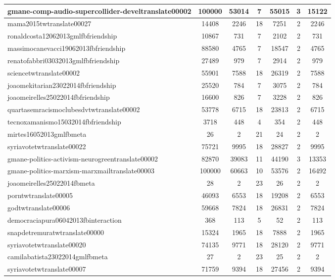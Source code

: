 \begin{table*}[h!]
\begin{center}
\begin{tabular}{| l | c | c | c | c | c | c |}
gmane-comp-audio-supercollider-develtranslate00002 & 100000  & 53014  & 7  & 55015  & 3  & 15122 \\\hline
mama2015twtranslate00027 & 14408  & 2246  & 18  & 7251  & 2  & 2246 \\\hline
ronaldcosta12062013gmlfbfriendship & 10867  & 731  & 7  & 2102  & 2  & 731 \\\hline
massimocanevacci19062013fbfriendship & 88580  & 4765  & 7  & 18547  & 2  & 4765 \\\hline
renatofabbri03032013gmlfbfriendship & 27489  & 979  & 7  & 2914  & 2  & 979 \\\hline
sciencetwtranslate00002 & 55901  & 7588  & 18  & 26319  & 2  & 7588 \\\hline
joaomekitarian23022014fbfriendship & 25520  & 784  & 7  & 3075  & 2  & 784 \\\hline
joaomeirelles25022014fbfriendship & 16600  & 826  & 7  & 3228  & 2  & 826 \\\hline
quartasemracismoclubesdvtwtranslate00002 & 53778  & 6715  & 18  & 23813  & 2  & 6715 \\\hline
tecnoxamanismo15032014fbfriendship & 3718  & 448  & 4  & 354  & 2  & 448 \\\hline
mirtes16052013gmlfbmeta & 26  & 2  & 21  & 24  & 2  & 2 \\\hline
syriavotetwtranslate00022 & 75721  & 9995  & 18  & 28827  & 2  & 9995 \\\hline
gmane-politics-activism-neurogreentranslate00002 & 82870  & 39083  & 11  & 44190  & 3  & 13353 \\\hline
gmane-politics-marxism-marxmailtranslate00003 & 100000  & 60663  & 10  & 53576  & 2  & 16492 \\\hline
joaomeirelles25022014fbmeta & 28  & 2  & 23  & 26  & 2  & 2 \\\hline
porntwtranslate00005 & 46093  & 6553  & 18  & 19208  & 2  & 6553 \\\hline
godtwtranslate00006 & 59668  & 7824  & 18  & 26831  & 2  & 7824 \\\hline
democraciapura06042013fbinteraction & 368  & 113  & 5  & 52  & 2  & 113 \\\hline
snapdetremuratwtranslate00000 & 15324  & 1965  & 18  & 7888  & 2  & 1965 \\\hline
syriavotetwtranslate00020 & 74135  & 9771  & 18  & 28120  & 2  & 9771 \\\hline
camilabatista23022014gmlfbmeta & 27  & 2  & 23  & 25  & 2  & 2 \\\hline
syriavotetwtranslate00007 & 71759  & 9394  & 18  & 27456  & 2  & 9394 \\\hline

\end{tabular}
\end{center}
\end{table*}
